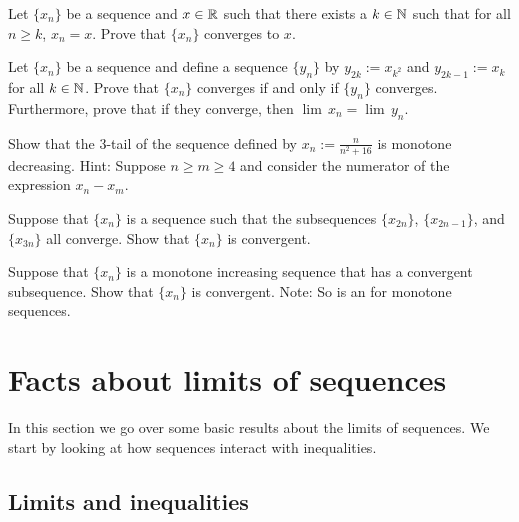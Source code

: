 \begin{exercise}[Easy]
Let $\{ x_n \}$ be a sequence and $x \in {\mathbb{R}}$ such that
there exists a $k \in {\mathbb{N}}$ such that for all $n \geq k$,
$x_n = x$.  Prove that $\{ x_n \}$ converges to $x$.
\end{exercise}

\begin{exercise}
Let $\{ x_n \}$ be a sequence and
define a sequence $\{ y_n \}$ by
$y_{2k} := x_{k^2}$ and $y_{2k-1} := x_k$ for all $k \in {\mathbb{N}}$.
Prove that $\{ x_n \}$ converges if and only if $\{ y_n \}$ converges.
Furthermore, prove that if they converge, then
$\lim\, x_n = \lim\, y_n$.
\end{exercise}

\begin{exercise}
Show that the 3-tail of the sequence defined by $x_n := \frac{n}{n^2+16}$ is
monotone decreasing.  Hint: Suppose $n \geq m \geq 4$ and consider the 
numerator of the expression $x_n-x_m$.
\end{exercise}

\begin{exercise}
Suppose that $\{ x_n \}$ is a sequence such that
the subsequences $\{ x_{2n} \}$, $\{ x_{2n-1} \}$, and
$\{ x_{3n} \}$ all converge.  Show that $\{ x_n \}$ is convergent.
\end{exercise}

\begin{exercise}
Suppose that $\{ x_n \}$ is a monotone increasing sequence that
has a convergent subsequence.
Show that $\{ x_n \}$ is convergent.
Note: So  is an  for monotone sequences.
\end{exercise}


\sectionnewpage
\section{Facts about limits of sequences}
\label{sec:factslimsseqs}


In this section we go over some basic results about the limits of
sequences.
We start by looking at how sequences interact with inequalities.

\subsection{Limits and inequalities}

